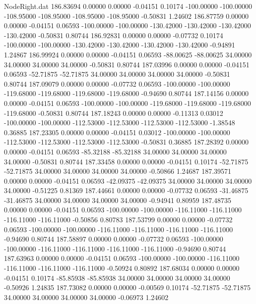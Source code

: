 \begin{filecontents}{NodeRight.dat}
 186.83694    0.00000    0.00000    -0.04151    0.10174 -100.00000 -100.00000 -108.95000 -108.95000 -108.95000 -108.95000   -0.50831    1.24602
 186.87759    0.00000    0.00000    -0.04151    0.06593 -100.00000 -100.00000 -130.42000 -130.42000 -130.42000 -130.42000   -0.50831    0.80744
 186.92831    0.00000    0.00000    -0.07732    0.10174 -100.00000 -100.00000 -130.42000 -130.42000 -130.42000 -130.42000   -0.94891    1.24867
 186.99924    0.00000    0.00000    -0.04151    0.06593  -88.00625  -88.00625   34.00000   34.00000   34.00000   34.00000   -0.50831    0.80744
 187.03996    0.00000    0.00000    -0.04151    0.06593  -52.71875  -52.71875   34.00000   34.00000   34.00000   34.00000   -0.50831    0.80744
 187.09079    0.00000    0.00000    -0.07732    0.06593 -100.00000 -100.00000 -119.68000 -119.68000 -119.68000 -119.68000   -0.94690    0.80744
 187.14156    0.00000    0.00000    -0.04151    0.06593 -100.00000 -100.00000 -119.68000 -119.68000 -119.68000 -119.68000   -0.50831    0.80744
 187.18243    0.00000    0.00000    -0.11313    0.03012 -100.00000 -100.00000 -112.53000 -112.53000 -112.53000 -112.53000   -1.38548    0.36885
 187.23305    0.00000    0.00000    -0.04151    0.03012 -100.00000 -100.00000 -112.53000 -112.53000 -112.53000 -112.53000   -0.50831    0.36885
 187.28392    0.00000    0.00000    -0.04151    0.06593  -85.32188  -85.32188   34.00000   34.00000   34.00000   34.00000   -0.50831    0.80744
 187.33458    0.00000    0.00000    -0.04151    0.10174  -52.71875  -52.71875   34.00000   34.00000   34.00000   34.00000   -0.50866    1.24687
 187.39571    0.00000    0.00000    -0.04151    0.06593  -42.09375  -42.09375   34.00000   34.00000   34.00000   34.00000   -0.51225    0.81369
 187.44661    0.00000    0.00000    -0.07732    0.06593  -31.46875  -31.46875   34.00000   34.00000   34.00000   34.00000   -0.94941    0.80959
 187.48735    0.00000    0.00000    -0.04151    0.06593 -100.00000 -100.00000 -116.11000 -116.11000 -116.11000 -116.11000   -0.50856    0.80783
 187.53799    0.00000    0.00000    -0.07732    0.06593 -100.00000 -100.00000 -116.11000 -116.11000 -116.11000 -116.11000   -0.94690    0.80744
 187.58897    0.00000    0.00000    -0.07732    0.06593 -100.00000 -100.00000 -116.11000 -116.11000 -116.11000 -116.11000   -0.94690    0.80744
 187.63963    0.00000    0.00000    -0.04151    0.06593 -100.00000 -100.00000 -116.11000 -116.11000 -116.11000 -116.11000   -0.50924    0.80892
 187.68034    0.00000    0.00000    -0.04151    0.10174  -85.85938  -85.85938   34.00000   34.00000   34.00000   34.00000   -0.50926    1.24835
 187.73082    0.00000    0.00000    -0.00569    0.10174  -52.71875  -52.71875   34.00000   34.00000   34.00000   34.00000   -0.06973    1.24602

\end{filecontents}
